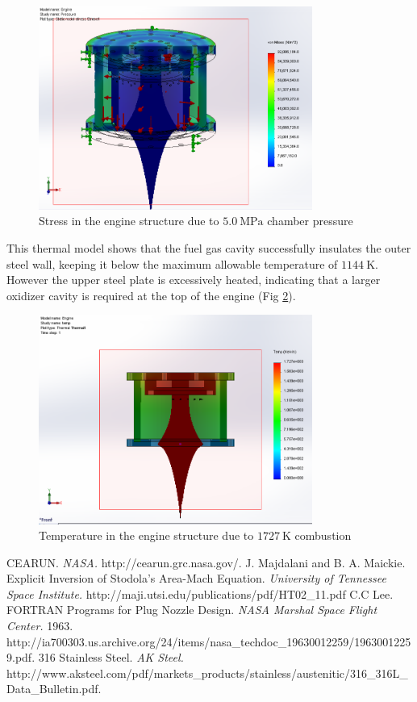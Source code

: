 \documentclass{article}
\begin{document}
\begin{figure}[h!]
\centering
\includegraphics[width = 0.8\textwidth]{engine_pressure.png}
\caption{Stress in the engine structure due to $\SI{5.0}{\mega\pascal}$ chamber pressure} 
\label{engine_pressure}
\end{figure}
This thermal model shows that the fuel gas cavity successfully insulates the outer steel wall, keeping it below the maximum allowable temperature of $\SI{1144}{\kelvin}$. However the upper steel plate is excessively heated, indicating that a larger oxidizer cavity is required at the top of the engine (Fig \ref{engine_temperature}).
\begin{figure}[h!]
\centering
\includegraphics[width = 0.8\textwidth]{engine_temp_fail.png}
\caption{Temperature in the engine structure due to $\SI{1727}{\kelvin}$ combustion} 
\label{engine_temperature}
\end{figure}
\begin{thebibliography}{9}
	 CEARUN. \emph{NASA.} http://cearun.grc.nasa.gov/.
	 J. Majdalani and B. A. Maickie. Explicit Inversion of Stodola's Area-Mach Equation. \emph{University of Tennessee Space Institute.} http://maji.utsi.edu/publications/pdf/HT02\_11.pdf
	 C.C Lee. FORTRAN Programs for Plug Nozzle Design. \emph{NASA Marshal Space Flight Center.} 1963. http://ia700303.us.archive.org/24/items/nasa\_techdoc\_19630012259/19630012259.pdf.
	 316 Stainless Steel. \emph{AK Steel.} http://www.aksteel.com/pdf/markets\_products/stainless/austenitic/316\_316L\_Data\_Bulletin.pdf.
\end{thebibliography}
\end{document}
